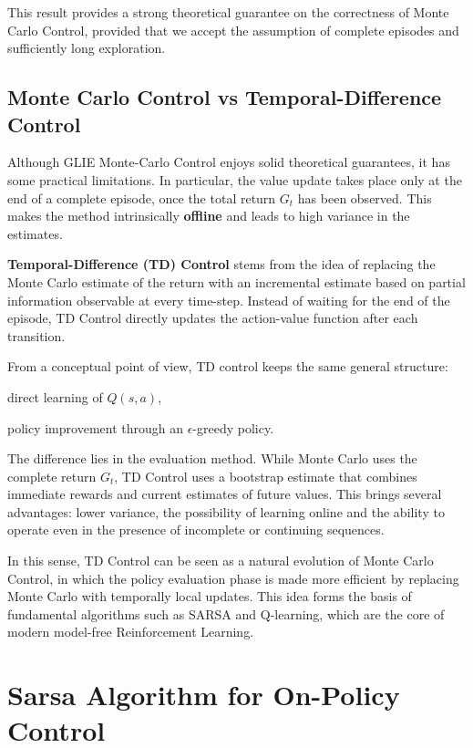This result provides a strong theoretical guarantee on the correctness of Monte Carlo Control, provided that we accept the assumption of complete episodes and sufficiently long exploration.


\subsection{Monte Carlo Control vs Temporal-Difference Control}

Although GLIE Monte-Carlo Control enjoys solid theoretical guarantees, it has some practical limitations. In particular, the value update takes place only at the end of a complete episode, once the total return $G_t$ has been observed. This makes the method intrinsically \textbf{offline} and leads to high variance in the estimates.

\textbf{Temporal-Difference (TD) Control} stems from the idea of replacing the Monte Carlo estimate of the return with an incremental estimate based on partial information observable at every time-step. Instead of waiting for the end of the episode, TD Control directly updates the action-value function after each transition.

From a conceptual point of view, TD control keeps the same general structure:
\begin{compactitemize}
    \item direct learning of $Q(s,a)$,
    \item policy improvement through an $\epsilon$-greedy policy.
\end{compactitemize}

The difference lies in the evaluation method. While Monte Carlo uses the complete return $G_t$, TD Control uses a bootstrap estimate that combines immediate rewards and current estimates of future values. This brings several advantages: lower variance, the possibility of learning online and the ability to operate even in the presence of incomplete or continuing sequences.

In this sense, TD Control can be seen as a natural evolution of Monte Carlo Control, in which the policy evaluation phase is made more efficient by replacing Monte Carlo with temporally local updates. This idea forms the basis of fundamental algorithms such as SARSA and Q-learning, which are the core of modern model-free Reinforcement Learning.

\section{Sarsa Algorithm for On-Policy Control}

